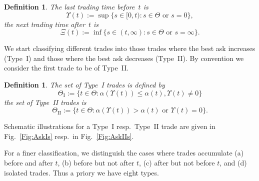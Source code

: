 \documentclass[11pt]{scrartcl}
\newtheorem{definition}[theorem]{Definition}
\newcommand{\lasttrade}{\Upsilon}
\begin{document}
\begin{definition}\label{d:first and last trading time}
The \emph{last trading time} before~$t$ is 
\begin{equation}
\Upsilon(t):=\sup\{s\in[0,t):\mbox{$s\in\Theta$ or $s=0$}\},
\end{equation}
the \emph{next trading time} after~$t$ is 
\begin{equation}
\Xi(t) := \inf\{s\in(t,\infty):\mbox{$s\in\Theta$ or $s=\infty$}\}.
\end{equation}
\end{definition}

We start classifying different trades into those trades where the best ask
increases (Type~{I}) and those where the best ask decreases (Type~{II}). By
convention we consider the first trade to be of Type~{II}.

\begin{definition}
The set of \emph{Type~{I} trades} is defined by 
\begin{equation}
\Theta _{\mathrm{I}}:=\{t\in \Theta :\alpha (\Upsilon (t))\leq \alpha
(t),\Upsilon (t)\neq 0\}
\end{equation}%
the set of \emph{Type~{II} trades} is 
\begin{equation*}
\Theta _{\mathrm{II}}:=\{t\in \Theta :%
\mbox{$\alpha(\lasttrade(t)) >
\alpha(t)$ or $\lasttrade(t)=0$}\}.
\end{equation*}
\end{definition}

Schematic illustrations for a Type~{I} resp.\ Type~{II} trade are given in
Fig.~\ref{Fig:AskIs} resp.\ in Fig.~\ref{Fig:AskIIs}.

For a finer classification, we distinguish the cases where trades accumulate
(a) before and after $t$, (b) before but not after $t$, (c) after but not
before $t$, and (d) isolated trades. Thus a priory we have eight types.
\end{document}

